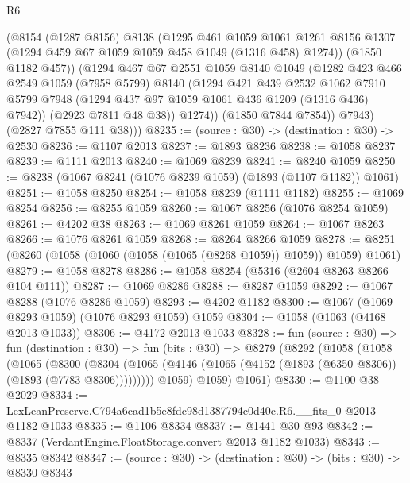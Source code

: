 \begin{lexlean}{R6}
\begin{coremodule}
              (@8154
                (@1287 @8156)
                @8138
                (@1295
                  @461
                  @1059
                  @1061
                  @1261
                  @8156
                  @1307
                  (@1294 @459 @67 @1059 @1059 @458 @1049 (@1316 @458) @1274))
                (@1850 @1182 @457))
              (@1294
                @467
                @67
                @2551
                @1059
                @8140
                @1049
                (@1282
                  @423
                  @466
                  @2549
                  @1059
                  (@7958 @5799)
                  @8140
                  (@1294
                    @421
                    @439
                    @2532
                    @1062
                    @7910
                    @5799
                    @7948
                    (@1294 @437 @97 @1059 @1061 @436 @1209 (@1316 @436) @7942))
                  (@2923 @7811 @48 @38))
                @1274))
            (@1850 @7844 @7854))
          @7943)
        (@2827 @7855 @111 @38)))
@8235 := (source : @30) -> (destination : @30) -> @2530
@8236 := @1107 @2013
@8237 := @1893 @8236
@8238 := @1058 @8237
@8239 := @1111 @2013
@8240 := @1069 @8239
@8241 := @8240 @1059
@8250 := @8238 (@1067 @8241 (@1076 @8239 @1059) (@1893 (@1107 @1182)) @1061)
@8251 := @1058 @8250
@8254 := @1058 @8239 (@1111 @1182)
@8255 := @1069 @8254
@8256 := @8255 @1059
@8260 := @1067 @8256 (@1076 @8254 @1059)
@8261 := @4202 @38
@8263 := @1069 @8261 @1059
@8264 := @1067 @8263
@8266 := @1076 @8261 @1059
@8268 := @8264 @8266 @1059
@8278 := @8251 (@8260 (@1058 (@1060 (@1058 (@1065 (@8268 @1059)) @1059)) @1059) @1061)
@8279 := @1058 @8278
@8286 := @1058 @8254 (@5316 (@2604 @8263 @8266 @104 @111))
@8287 := @1069 @8286
@8288 := @8287 @1059
@8292 := @1067 @8288 (@1076 @8286 @1059)
@8293 := @4202 @1182
@8300 := @1067 (@1069 @8293 @1059) (@1076 @8293 @1059) @1059
@8304 := @1058 (@1063 (@4168 @2013 @1033))
@8306 := @4172 @2013 @1033
@8328 := fun (source : @30) =>
  fun (destination : @30) =>
  fun (bits : @30) =>
  @8279
    (@8292
      (@1058
        (@1058
          (@1065
            (@8300
              (@8304 (@1065 (@4146 (@1065 (@4152 (@1893 (@6350 @8306)) (@1893 (@7783 @8306)))))))))
          @1059)
        @1059)
      @1061)
@8330 := @1100 @38 @2029
@8334 := LexLeanPreserve.C794a6cad1b5e8fdc98d1387794c0d40c.R6.__fits_0 @2013 @1182 @1033
@8335 := @1106 @8334
@8337 := @1441 @30 @93
@8342 := @8337 (VerdantEngine.FloatStorage.convert @2013 @1182 @1033)
@8343 := @8335 @8342
@8347 := (source : @30) -> (destination : @30) -> (bits : @30) -> @8330 @8343

\end{coremodule}
\end{lexlean}
